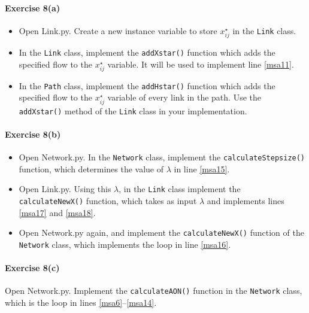\documentclass[11pt]{article}
\begin{document}

\paragraph*{Exercise 8(a)} 
\begin{itemize}
	\item Open Link.py. Create a new instance variable to store $x^\star_{ij}$ in the \texttt{Link} class.
\item In the \texttt{Link} class, implement the \texttt{addXstar()} function which adds the specified flow to the $x^\star_{ij}$ variable.
It will be used to implement line \ref{msa11}. 

\item In the \texttt{Path} class, implement the \texttt{addHstar()} function which adds the specified flow to the $x^\star_{ij}$ variable of every link in the path. Use the \texttt{addXstar()} method of the \texttt{Link} class in your implementation.
\end{itemize}



\paragraph*{Exercise 8(b)} 
\begin{itemize}
	\item Open Network.py. In the \texttt{Network} class, implement the \texttt{calculateStepsize()} function, which determines the value of $\lambda$ in line \ref{msa15}. 
	
	\item Open Link.py. Using this $\lambda$, in the \texttt{Link} class implement the \texttt{calculateNewX()} function, which takes as input $\lambda$ and implements lines \ref{msa17} and \ref{msa18}. 
	
	\item Open Network.py again, and implement the \texttt{calculateNewX()} function of the \texttt{Network} class, which implements the loop in line \ref{msa16}. 
\end{itemize}



\paragraph*{Exercise 8(c)} Open Network.py. Implement the \texttt{calculateAON()} function in the \texttt{Network} class, which is the loop in lines \ref{msa6}--\ref{msa14}. 
\end{document}
